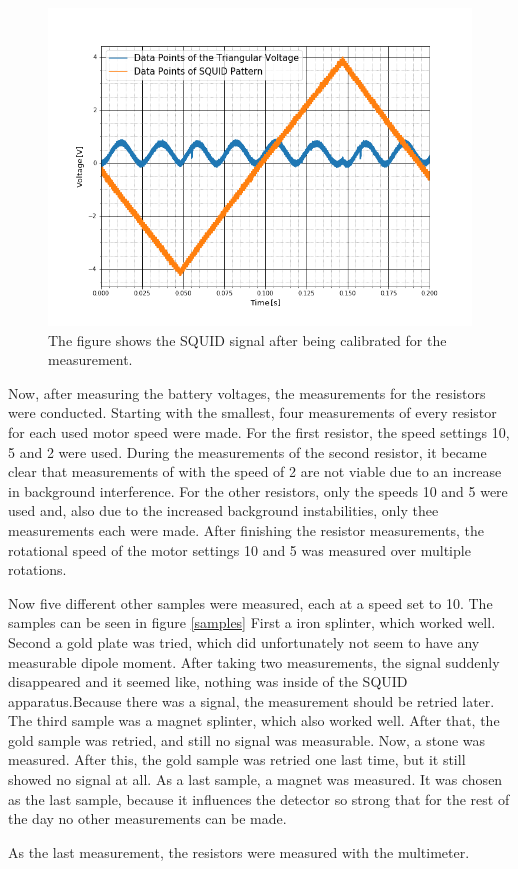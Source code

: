 \begin{figure}[ht]
\includegraphics[scale=0.5]{Bild/Eichung}
\centering
\caption[Picture of the calibration of the SQUID]{\small The figure shows the SQUID signal after being calibrated for the measurement. }
\label{cali_squid}
\end{figure}
\par
Now, after measuring the battery voltages, the measurements for the resistors were conducted. Starting with the smallest, four measurements of every resistor for each used motor speed were made. For the first resistor, the speed settings 10, 5 and 2 were used. During the measurements of the second resistor, it became clear that measurements of with the speed of 2 are not viable due to an increase in background interference. For the other resistors, only the speeds 10 and 5 were used and, also due to the increased background instabilities, only thee measurements each were made. After finishing the resistor measurements, the rotational speed of the motor settings 10 and 5 was measured over multiple rotations.\par
Now five different other samples were measured, each at a speed set to 10. The samples can be seen in figure \ref{samples} First a iron splinter, which worked well. Second a gold plate was tried, which did unfortunately not seem to have any measurable dipole moment. After taking two measurements, the signal suddenly disappeared and it seemed like, nothing was inside of the SQUID apparatus.Because there was a signal, the measurement should be retried later. The third sample was a magnet splinter, which also worked well.
After that, the gold sample was retried, and still no signal was measurable. Now, a stone was measured. After this, the gold sample was retried one last time, but it still showed no signal at all. As a last sample, a magnet was measured. It was chosen as the last sample, because it influences the detector so strong that for the rest of the day no other measurements can be made. \par
As the last measurement, the resistors were measured with the multimeter.

